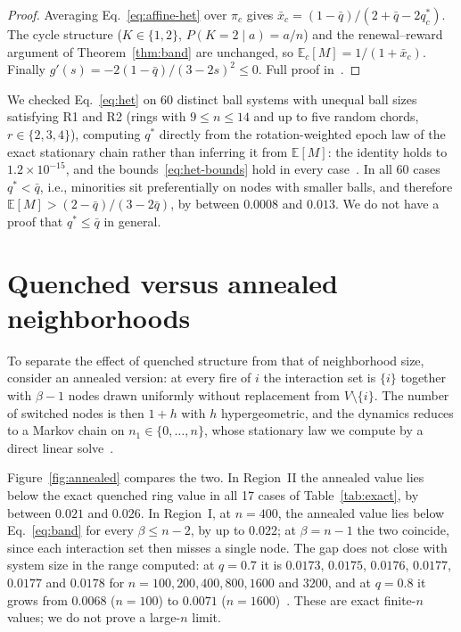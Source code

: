 \documentclass[aps,pre,reprint,superscriptaddress,amsmath,amssymb,longbibliography]{revtex4-2}
\theoremstyle{remark}
\newcommand{\E}{\mathbb{E}}
\begin{document}
\begin{proof}
Averaging Eq.~\eqref{eq:affine-het} over $\pi_c$ gives
$\bar x_c=(1-\bar q)/(2+\bar q-2q^\ast_c)$. The cycle structure
($K\in\{1,2\}$, $P(K=2\mid a)=a/n$) and the renewal--reward argument of
Theorem~\ref{thm:band} are unchanged, so $\E_c[M]=1/(1+\bar x_c)$.
Finally $g'(s)=-2(1-\bar q)/(3-2s)^2\le0$. Full proof in~\cite{SM}.
\end{proof}

We checked Eq.~\eqref{eq:het} on 60 distinct ball systems with unequal
ball sizes satisfying R1 and R2 (rings with $9\le n\le14$ and up to five
random chords, $r\in\{2,3,4\}$), computing $q^\ast$ directly from the
rotation-weighted epoch law of the exact stationary chain rather than
inferring it from $\E[M]$: the identity holds to $1.2\times10^{-15}$, and
the bounds~\eqref{eq:het-bounds} hold in every case~\cite{SM}. In all 60
cases $q^\ast<\bar q$, i.e., minorities sit preferentially on nodes with
smaller balls, and therefore $\E[M]>(2-\bar q)/(3-2\bar q)$, by between
$0.0008$ and $0.013$. We do not have a proof that $q^\ast\le\bar q$ in
general.

\section{Quenched versus annealed neighborhoods}
\label{sec:annealed}

To separate the effect of quenched structure from that of neighborhood
size, consider an annealed version: at every fire of $i$ the interaction
set is $\{i\}$ together with $\beta-1$ nodes drawn uniformly without
replacement from $V\setminus\{i\}$. The number of switched nodes is then
$1+h$ with $h$ hypergeometric, and the dynamics reduces to a Markov chain
on $n_1\in\{0,\dots,n\}$, whose stationary law we compute by a direct
linear solve~\cite{SM}.

Figure~\ref{fig:annealed} compares the two. In Region~II the annealed
value lies below the exact quenched ring value in all 17 cases of
Table~\ref{tab:exact}, by between $0.021$ and $0.026$. In Region~I, at
$n=400$, the annealed value lies below Eq.~\eqref{eq:band} for every
$\beta\le n-2$, by up to $0.022$; at $\beta=n-1$ the two coincide,
since each interaction set then misses a single node. The gap does not
close with system size in the range computed: at $q=0.7$ it is $0.0173$,
$0.0175$, $0.0176$, $0.0177$, $0.0177$ and $0.0178$ for
$n=100,200,400,800,1600$ and $3200$, and at $q=0.8$ it grows from
$0.0068$ ($n=100$) to $0.0071$ ($n=1600$)~\cite{SM}. These are exact
finite-$n$ values; we do not prove a large-$n$ limit.
\end{document}
